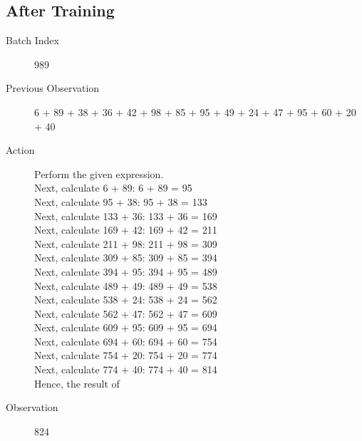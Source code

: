 \documentclass{article}
\begin{document}
\subsection{After Training}
\begin{description}
    \item[Batch Index] 989
    \item[Previous Observation] 6 + 89 + 38 + 36 + 42 + 98 + 85 + 95 + 49 + 24 + 47 + 95 + 60 + 20 + 40
    \item[Action] Perform the given expression.\\[1ex]
    Next, calculate 6 + 89: 6 + 89 = 95\\[1ex]
    Next, calculate 95 + 38: 95 + 38 = 133\\[1ex]
    Next, calculate 133 + 36: 133 + 36 = 169\\[1ex]
    Next, calculate 169 + 42: 169 + 42 = 211\\[1ex]
    Next, calculate 211 + 98: 211 + 98 = 309\\[1ex]
    Next, calculate 309 + 85: 309 + 85 = 394\\[1ex]
    Next, calculate 394 + 95: 394 + 95 = 489\\[1ex]
    Next, calculate 489 + 49: 489 + 49 = 538\\[1ex]
    Next, calculate 538 + 24: 538 + 24 = 562\\[1ex]
    Next, calculate 562 + 47: 562 + 47 = 609\\[1ex]
    Next, calculate 609 + 95: 609 + 95 = 694\\[1ex]
    Next, calculate 694 + 60: 694 + 60 = 754\\[1ex]
    Next, calculate 754 + 20: 754 + 20 = 774\\[1ex]
    Next, calculate 774 + 40: 774 + 40 = 814\\[1ex]
    Hence, the result of
    \item[Observation] 824
\end{description}
\end{document}
